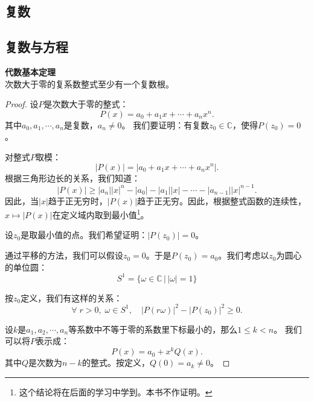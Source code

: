 \documentclass[12pt,UTF8]{ctexbook}
\begin{document}


\begin{appendix}

\chapter{复数}

\section{复数与方程}

\begin{tm}{\textbf{代数基本定理}}
    \mbox{} \\
    次数大于零的复系数整式至少有一个复数根。
\end{tm}

\begin{proof}
    设$P$是次数大于零的整式：
    $$ P(x) = a_0 + a_1 x + \cdots + a_n x^n.$$
    其中$a_0, a_1, \cdots , a_n$是复数，$a_n \neq 0$。
    我们要证明：有复数$z_0\in\mathbb{C}$，使得$P(z_0) = 0$。

    对整式$P$取模：
    $$ |P(x)| = |a_0 + a_1 x + \cdots + a_n x^n|. $$
    根据三角形边长的关系，我们知道：
    $$ |P(x)| \geqslant |a_n| |x|^n - |a_0| - |a_1||x| - \cdots - |a_{n-1}| |x|^{n-1}. $$
    因此，当$|x|$趋于正无穷时，$|P(x)|$趋于正无穷。因此，根据整式函数的连续性，$x\mapsto |P(x)|$在定义域内取到最小值\footnote{这个结论将在后面的学习中学到。本书不作证明。}。

    设$z_0$是取最小值的点。我们希望证明：$|P(z_0)| = 0$。
    
    通过平移的方法，我们可以假设$z_0 = 0$。于是$P(z_0) = a_0$。我们考虑以$z_0$为圆心的单位圆：
    $$ S^1 = \{\omega\in\mathbb{C} \, | \, |\omega| = 1\}$$

    按$z_0$定义，我们有这样的关系：
    $$ \forall \; r > 0, \; \omega \in S^1,\quad  |P(r\omega)|^2 - |P(z_0)|^2 \geqslant 0. $$ 

    设$k$是$a_1, a_2, \cdots, a_n$等系数中不等于零的系数里下标最小的，那么$1\leqslant k < n$。
    我们可以将$P$表示成：
    $$ P(x) = a_0 + x^k Q(x). $$
    其中$Q$是次数为$n - k$的整式。按定义，$Q(0) = a_k \neq 0$。


\end{proof}
\end{appendix}
\end{document}
